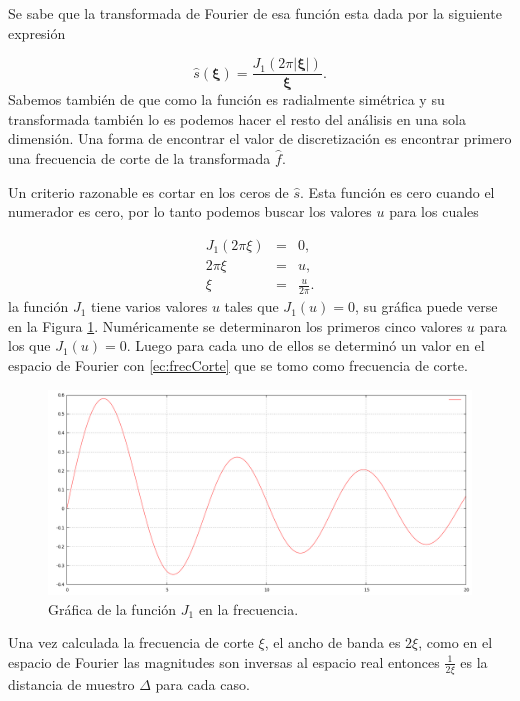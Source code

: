 Se sabe que la transformada de Fourier de esa función esta dada por la siguiente expresión \cite{fourierBook}

\begin{equation}
  \hat{s}(\bm \xi) = \dfrac{J_1 (2 \pi |\bm \xi|)}{\bm \xi}.
\label{ec:ftSphere}
\end{equation}
Sabemos también de \cite{fourierBook} que como la función es radialmente simétrica y su transformada también lo es podemos hacer el resto del análisis en una sola dimensión. Una forma de encontrar el valor de discretización es encontrar primero una frecuencia de corte de la transformada $\hat{f}$.

Un criterio razonable es cortar en los ceros de $\hat{s}$. Esta función es cero cuando el numerador es cero, por lo tanto podemos buscar los valores $u$ para los cuales

\begin{eqnarray}
  \nonumber
  J_1(2 \pi \xi) & = & 0, \\
  \nonumber
  2 \pi \xi & = & u, \\
  \xi & = & \frac{u}{2 \pi}.
  \label{ec:frecCorte}
\end{eqnarray}
la función $J_1$ tiene varios valores $u$ tales que $J_1(u) = 0$, su gráfica puede verse en la Figura \ref{fig:grafBess1}. Numéricamente se determinaron los primeros cinco valores $u$ para los que $J_1(u)=0$. Luego para cada uno de ellos se determinó un valor en el espacio de Fourier con \eqref{ec:frecCorte} que se tomo como frecuencia de corte. 

\begin{figure}[htp]
 \centering
  \includegraphics[scale=0.3]{img/cap03/J_1}
  \caption[Gráfica de la función $J_{1}$ en la frecuencia]{Gráfica de la función $J_{1}$ en la frecuencia.}
  \label{fig:grafBess1}
\end{figure}

Una vez calculada la frecuencia de corte $\xi$, el ancho de banda es $2 \xi$, como en el espacio de Fourier las magnitudes son inversas al espacio real entonces $\frac{1}{2 \xi}$ es la distancia de muestro $\Delta$ para cada caso.

